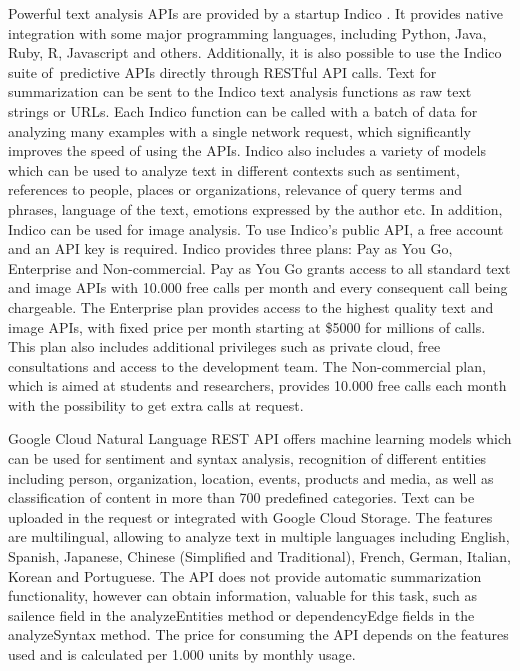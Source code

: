 \documentclass[11pt,a4paper,onecolumn]{article}
\begin{document}
Powerful text analysis APIs are provided by a startup Indico \cite{indicoapi}.
It provides native integration with some major programming languages, including Python, Java, Ruby, R, Javascript and others.
Additionally, it is also possible to use the Indico suite of predictive APIs directly through RESTful API calls.
Text for summarization can be sent to the Indico text analysis functions as raw text strings or URLs.
Each Indico function can be called with a batch of data for analyzing many examples with a single network request, which significantly improves the speed of using the APIs.
Indico also includes a variety of models which can be used to analyze text in different contexts such as sentiment, references to people, places or organizations, relevance of query terms and phrases, language of the text, emotions expressed by the author etc.
In addition, Indico can be used for image analysis.
To use Indico's public API, a free account and an API key is required.
Indico provides three plans: Pay as You Go, Enterprise and Non-commercial.
Pay as You Go grants access to all standard text and image APIs with 10.000 free calls per month and every consequent call being chargeable.
The Enterprise plan provides access to the highest quality text and image APIs, with fixed price per month starting at \$5000 for millions of calls.
This plan also includes additional privileges such as private cloud, free consultations and access to the development team.
The Non-commercial plan, which is aimed at students and researchers, provides 10.000 free calls each month with the possibility to get extra calls at request.

Google Cloud Natural Language REST API \cite{googleapi} offers machine learning models which can be used for sentiment and syntax analysis, recognition of different entities including person, organization, location, events, products and media, as well as classification of content in more than 700 predefined categories.
Text can be uploaded in the request or integrated with Google Cloud Storage.
The features are multilingual, allowing to analyze text in multiple languages including English, Spanish, Japanese, Chinese (Simplified and Traditional), French, German, Italian, Korean and Portuguese.
The API does not provide automatic summarization functionality, however can obtain information, valuable for this task, such as sailence field in the analyzeEntities method or dependencyEdge fields in the analyzeSyntax method.
The price for consuming the API depends on the features used and is calculated per 1.000 units by monthly usage.
\end{document}
